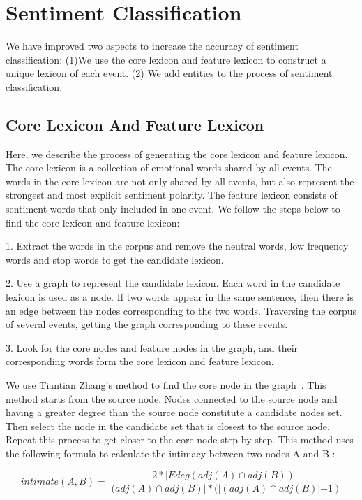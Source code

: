 \documentclass[runningheads]{llncs}
\begin{document}
\section{Sentiment Classification}\label{sec:sentiment classification}
We have improved two aspects to increase the accuracy of sentiment classification:  (1)We use the core lexicon and feature lexicon to construct a unique lexicon of each event. (2) We add entities to the process of sentiment classification.
\subsection{Core Lexicon And Feature Lexicon}
Here, we describe the process of generating the core lexicon and feature lexicon.
The core lexicon is a collection of emotional words shared by all events. The words in the core lexicon are not only shared by all events, but also represent the strongest and most explicit sentiment polarity. The feature lexicon consists of sentiment words that only included in one event. We follow the steps below to find the core lexicon and feature lexicon: 

1. Extract the words in the corpus and remove the neutral words, low frequency words and stop words to get the candidate lexicon. 

2. Use a graph to represent the candidate lexicon. Each word in the candidate lexicon is used as a node. If two words appear in the same sentence, then there is an edge between the nodes corresponding to the two words. Traversing the corpus of several events, getting the graph corresponding to these events. 

3. Look for the core nodes and feature nodes in the graph, and their corresponding words form the core lexicon and feature lexicon.

We use Tiantian Zhang's method to find the core node in the graph~\cite{Zhang2012corenodes}. This method starts from the source node. Nodes connected to the source node and having a greater degree than the source node constitute a candidate nodes set. Then select the node in the candidate set that is closest to the source node. Repeat this process to get closer to the core node step by step. This method uses the following formula to calculate the intimacy between two nodes A and B :

\begin{equation}
    intimate(A,B) = \frac{2*|Edeg(adj(A)\cap adj(B))|}{|(adj(A)\cap adj(B)|*(|(adj(A)\cap adj(B)|-1)}
\end{equation}
\end{document}
